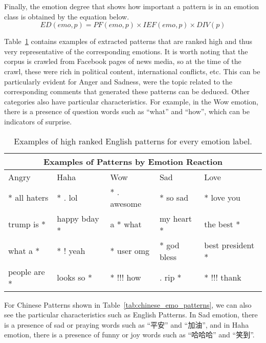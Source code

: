 \documentclass[12pt,a4paper]{report}
\theoremstyle{definition}
\begin{document}
\begin{CJK}{UTF8}{bsmi}
    Finally, the emotion degree that shows how important a pattern is in an emotion class is obtained by the equation below.
    \begin{equation}
    ED(emo,p) = PF(emo,p) \times IEF(emo,p) \times DIV(p)
    \end{equation}
    \par Table~\ref{tab:english_emo_patterns} contains examples of extracted patterns that are ranked high and thus very representative of the corresponding emotions. It is worth noting that the corpus is crawled from Facebook pages of news media, so at the time of the crawl, these were rich in political content, international conflicts, etc. This can be particularly evident for Anger and Sadness, were the topic related to the corresponding comments that generated these patterns can be deduced. Other categories also have particular characteristics. For example, in the Wow emotion, there is a presence of question words such as “what” and “how”, which can be indicators of surprise.
    \begin{table}[H]
    \centering
    \begin{tabular}{|p{2.5cm}|p{2.5cm}|p{2.5cm}|p{2.5cm}|p{3cm}|}
    \hline
    \multicolumn{5}{|c|}{Examples of Patterns by Emotion Reaction}                 \\ \hline
    Angry          & Haha         & Wow         & Sad           & Love             \\ \hline
    * all haters   & * . lol      & * . awesome & * so sad      & * love you       \\
    trump is *     & happy bday * & a * what    & my heart *    & the best *       \\
    what a *       & * ! yeah     & * user omg  & * god bless   & best president * \\
    people are *   & looks so *   & * !!! how   & . rip *       & * !!! thank      \\ \hline
    \end{tabular}
    \caption{Examples of high ranked English patterns for every emotion label.}
    \label{tab:english_emo_patterns}
    \end{table}
    \begin{CJK}{UTF8}{bsmi}
    \par For Chinese Patterns shown in Table~\ref{tab:chinese_emo_patterns}, we can also see the particular characteristics such as English Patterns. In Sad emotion, there is a presence of sad or praying words such as “平安” and “加油”, and in Haha emotion, there is a presence of funny or joy words such as “哈哈哈” and “笑到”.

\end{CJK}
\end{CJK}
\end{document}
